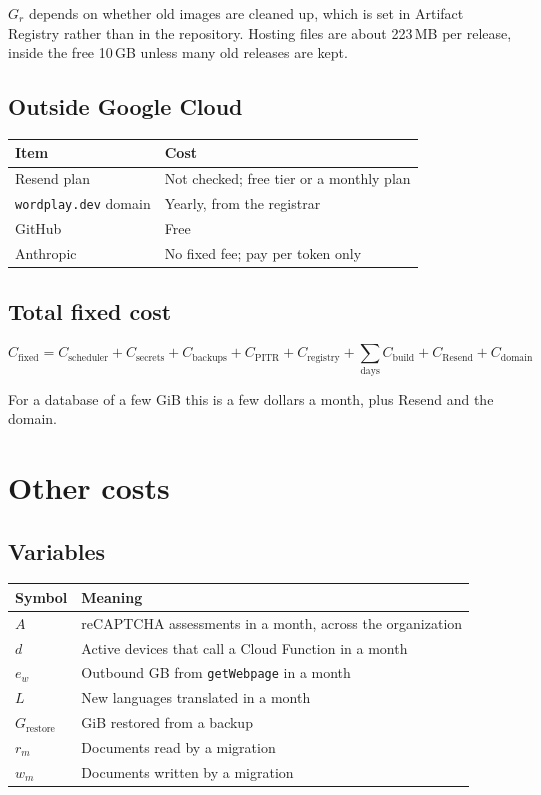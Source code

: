 \documentclass{article}
\begin{document}
$G_r$ depends on whether old images are cleaned up, which is set in Artifact
Registry rather than in the repository. Hosting files are about 223\,MB per
release, inside the free 10\,GB unless many old releases are kept.

\subsection{Outside Google Cloud}

\begin{center}
\begin{tabular}{ll}
\toprule
Item & Cost \\
\midrule
Resend plan & Not checked; free tier or a monthly plan \\
\texttt{wordplay.dev} domain & Yearly, from the registrar \\
GitHub & Free \\
Anthropic & No fixed fee; pay per token only \\
\bottomrule
\end{tabular}
\end{center}

\subsection{Total fixed cost}

\[
C_{\text{fixed}} =
C_{\text{scheduler}} + C_{\text{secrets}} + C_{\text{backups}}
+ C_{\text{PITR}} + C_{\text{registry}} + \sum_{\text{days}} C_{\text{build}}
+ C_{\text{Resend}} + C_{\text{domain}}
\]

For a database of a few GiB this is a few dollars a month, plus Resend and the
domain.

\section{Other costs}

\subsection{Variables}

\begin{center}
\begin{tabular}{ll}
\toprule
Symbol & Meaning \\
\midrule
$A$ & reCAPTCHA assessments in a month, across the organization \\
$d$ & Active devices that call a Cloud Function in a month \\
$e_w$ & Outbound GB from \texttt{getWebpage} in a month \\
$L$ & New languages translated in a month \\
$G_{\text{restore}}$ & GiB restored from a backup \\
$r_m$ & Documents read by a migration \\
$w_m$ & Documents written by a migration \\
\bottomrule
\end{tabular}
\end{center}
\end{document}

